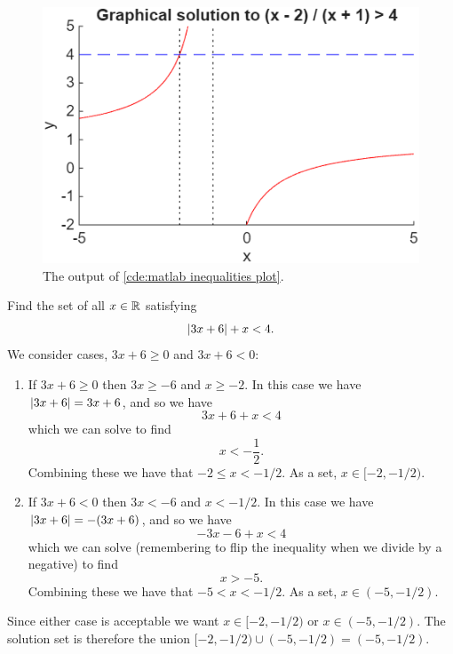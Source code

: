 \documentclass[fleqn]{LectureClass/LectureClass}
\begin{document}
    \begin{figure}
        \centering
        \includegraphics{images/matlab-inequalities-plot-output}
        \caption{The output of \cref{cde:matlab inequalities plot}.}
        \label{fig:inequalities example 2 matlab}
    \end{figure}
    
    \begin{exm}{}{}
        Find the set of all \(x \in \mathbb{R}\) satisfying
        \begin{equation}
            \lvert3x + 6\rvert + x < 4.
        \end{equation}
        We consider cases, \(3x + 6 \ge 0\) and \(3x + 6 < 0\):
        \begin{enumerate}
            \item If \(3x + 6 \ge 0\) then \(3x \ge -6\) and \(x \ge -2\).
            In this case we have \(\lvert3x + 6\rvert = 3x + 6\), and so we have
            \begin{equation}
                3x + 6 + x < 4
            \end{equation}
            which we can solve to find
            \begin{equation}
                x < -\frac{1}{2}.
            \end{equation}
            Combining these we have that \(-2 \le x < -1/2\).
            As a set, \(x \in [-2, -1/2)\).
            \item If \(3x + 6 < 0\) then \(3x < -6\) and \(x < -1/2\).
            In this case we have \(\lvert3x + 6\rvert = -(3x + 6)\), and so we have
            \begin{equation}
                -3x - 6 + x < 4
            \end{equation}
            which we can solve (remembering to flip the inequality when we divide by a negative) to find
            \begin{equation}
                x > -5.
            \end{equation}
            Combining these we have that \(-5 < x < -1/2\).
            As a set, \(x \in (-5, -1/2)\).
        \end{enumerate}
        Since either case is acceptable we want \(x \in [-2, -1/2)\) or \(x \in (-5, -1/2)\).
        The solution set is therefore the union \([-2, -1/2) \cup (-5, -1/2) = (-5, -1/2)\).
    \end{exm}
    
\end{document}
